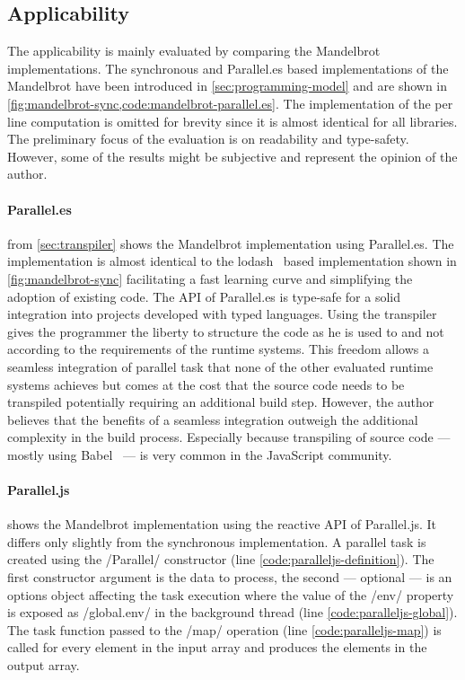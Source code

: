 \subsection{Applicability}
The applicability is mainly evaluated by comparing the Mandelbrot implementations. The synchronous and Parallel.es based implementations of the Mandelbrot have been introduced in \cref{sec:programming-model} and are shown in \cref{fig:mandelbrot-sync,code:mandelbrot-parallel.es}. The implementation of the per line computation is omitted for brevity since it is almost identical for all libraries. The preliminary focus of the evaluation is on readability and type-safety. However, some of the results might be subjective and represent the opinion of the author. 

\paragraph{Parallel.es}
 from \cref{sec:transpiler} shows the Mandelbrot implementation using Parallel.es. The implementation is almost identical to the lodash~\cite{lodash} based implementation shown in \cref{fig:mandelbrot-sync} facilitating a fast learning curve and simplifying the adoption of existing code. The API of Parallel.es is type-safe for a solid integration into projects developed with typed languages. Using the transpiler gives the programmer the liberty to structure the code as he is used to and not according to the requirements of the runtime systems. This freedom allows a seamless integration of parallel task that none of the other evaluated runtime systems achieves but comes at the cost that the source code needs to be transpiled potentially requiring an additional build step. However, the author believes that the benefits of a seamless integration outweigh the additional complexity in the build process. Especially because transpiling of source code --- mostly using Babel~\cite{babel} --- is very common in the JavaScript community. 

\paragraph{Parallel.js}
 shows the Mandelbrot implementation using the reactive API of Parallel.js. It differs only slightly from the synchronous implementation. A parallel task is created using the \javascriptinline/Parallel/ constructor (line \ref{code:paralleljs-definition}). The first constructor argument is the data to process, the second --- optional ---  is an options object affecting the task execution where the value of the \javascriptinline/env/ property is exposed as \javascriptinline/global.env/ in the background thread (line \ref{code:paralleljs-global}). The task function passed to the \javascriptinline/map/ operation (line \ref{code:paralleljs-map}) is called for every element in the input array and produces the elements in the output array.

